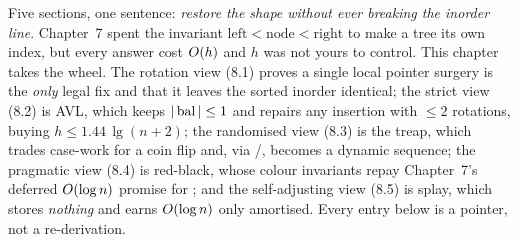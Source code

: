 

Five sections, one sentence: \emph{restore the shape without ever breaking the inorder line}. Chapter~7
spent the invariant $\text{left}<\text{node}<\text{right}$ to make a tree its own index, but every answer
cost $O(h)$ and $h$ was not yours to control. This chapter takes the wheel. The rotation view (8.1)
proves a single local pointer surgery is the \emph{only} legal fix and that it leaves the sorted inorder
identical; the strict view (8.2) is AVL, which keeps $|\operatorname{bal}|\le1$ and repairs any insertion with $\le2$
rotations, buying $h\le1.44\,\lg(n+2)$; the randomised view (8.3) is the treap, which trades case-work for a
coin flip and, via /, becomes a dynamic sequence; the pragmatic view (8.4) is
red-black, whose colour invariants repay Chapter~7's deferred $O(\log n)$ promise for ; and
the self-adjusting view (8.5) is splay, which stores \emph{nothing} and earns $O(\log n)$ only amortised.
Every entry below is a pointer, not a re-derivation.


